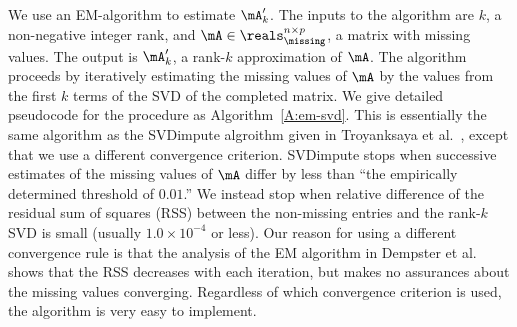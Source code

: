 We use an EM-algorithm to estimate $\mA'_k$. The inputs to the algorithm are
$k$, a non-negative integer rank, and $\mA \in \reals_\missing^{n \times p}$,
a matrix with missing values. The output is $\mA_k'$, a rank-$k$ approximation
of $\mA$. The algorithm proceeds by iteratively estimating the missing values
of $\mA$ by the values from the first $k$ terms of the SVD of the completed
matrix. We give detailed pseudocode for the procedure as
Algorithm~\ref{A:em-svd}. This is essentially the same algorithm as the
SVDimpute algroithm given in Troyanksaya et al.~\cite{troyanskaya2001missing},
except that we use a different convergence criterion. SVDimpute stops when
successive estimates of the missing values of $\mA$ differ by less than ``the
empirically determined threshold of $0.01$.'' We instead stop when relative
difference of the residual sum of squares (RSS) between the non-missing
entries and the rank-$k$ SVD is small (usually $1.0 \times 10^{-4}$ or less).
Our reason for using a different convergence rule is that the analysis of the
EM algorithm in Dempster et al.~\cite{dempster1977maximum} shows that the RSS
decreases with each iteration, but makes no assurances about the missing
values converging. Regardless of which convergence criterion is used, the
algorithm is very easy to implement.

